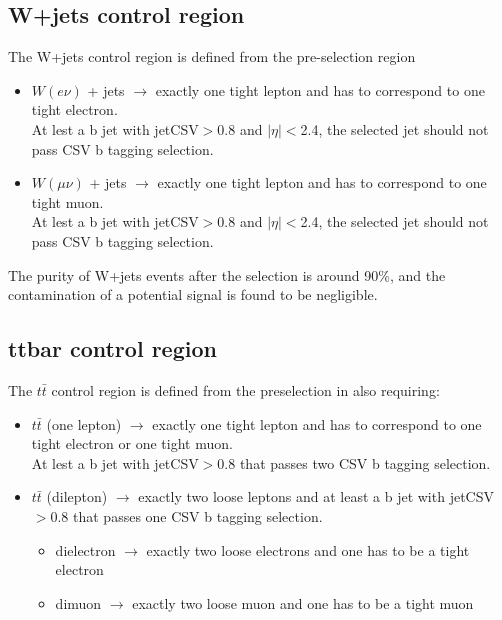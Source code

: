 \subsection{W+jets control region}
\itemsep=0pt\topsep=0pt\partopsep=0pt
The W+jets control region is defined from the pre-selection region 
\begin{itemize}
\item $W(e\nu)$ + jets $\rightarrow$ exactly one tight lepton and has to correspond to one tight electron.\\ 
At lest a b jet with jetCSV$>$0.8 and $|\eta|<$2.4, the selected jet should not pass CSV b tagging selection. 
\item $W(\mu\nu)$ + jets $\rightarrow$ exactly one tight lepton and has to correspond to one tight muon.\\ 
At lest a b jet with jetCSV$>$0.8 and $|\eta|<$2.4, the selected jet should not pass CSV b tagging selection.\\
\end{itemize}

The purity of W+jets events after the selection is around 90\%, and the contamination of a potential signal is found to be negligible.

\subsection{ttbar  control region}
\itemsep=0pt\topsep=0pt\partopsep=0pt
The $t\bar{t}$ control region is defined from the preselection in also requiring:
\begin{itemize}
\item $t\bar{t}$ (one lepton) $\rightarrow$ exactly one tight lepton and has to correspond to one tight electron or one tight muon.\\
At lest a b jet with jetCSV$>$0.8 that passes two CSV b tagging selection.
\item $t\bar{t}$ (dilepton) $\rightarrow$ exactly two loose leptons and at least a b jet with jetCSV$>$0.8 that passes one CSV b tagging selection.
	\begin{itemize}
	\item dielectron $\rightarrow$ exactly two loose electrons and one has to be a tight electron
    \item dimuon $\rightarrow$ exactly two loose muon and one has to be a tight muon
	\end{itemize}
\end{itemize}

